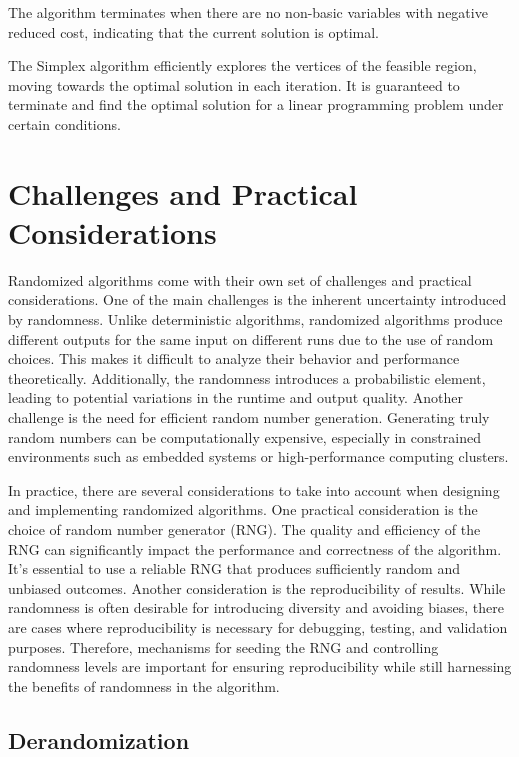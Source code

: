 \documentclass[12pt]{book} %
\begin{document}
The algorithm terminates when there are no non-basic variables with negative reduced cost, indicating that the current solution is optimal.

The Simplex algorithm efficiently explores the vertices of the feasible region, moving towards the optimal solution in each iteration. It is guaranteed to terminate and find the optimal solution for a linear programming problem under certain conditions.


\section{Challenges and Practical Considerations}

Randomized algorithms come with their own set of challenges and practical considerations. One of the main challenges is the inherent uncertainty introduced by randomness. Unlike deterministic algorithms, randomized algorithms produce different outputs for the same input on different runs due to the use of random choices. This makes it difficult to analyze their behavior and performance theoretically. Additionally, the randomness introduces a probabilistic element, leading to potential variations in the runtime and output quality. Another challenge is the need for efficient random number generation. Generating truly random numbers can be computationally expensive, especially in constrained environments such as embedded systems or high-performance computing clusters.

In practice, there are several considerations to take into account when designing and implementing randomized algorithms. One practical consideration is the choice of random number generator (RNG). The quality and efficiency of the RNG can significantly impact the performance and correctness of the algorithm. It's essential to use a reliable RNG that produces sufficiently random and unbiased outcomes. Another consideration is the reproducibility of results. While randomness is often desirable for introducing diversity and avoiding biases, there are cases where reproducibility is necessary for debugging, testing, and validation purposes. Therefore, mechanisms for seeding the RNG and controlling randomness levels are important for ensuring reproducibility while still harnessing the benefits of randomness in the algorithm.

\subsection{Derandomization}
\end{document}

